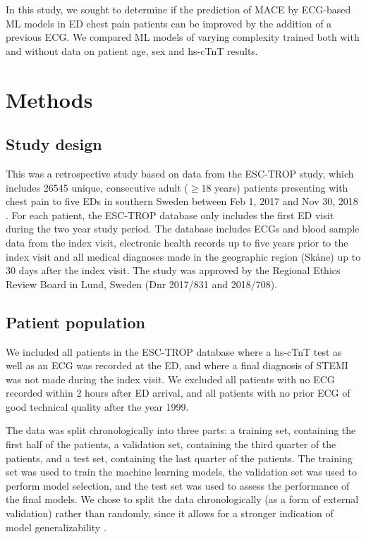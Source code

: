 \documentclass[preprint]{elsarticle}
\begin{document}
In this study, we sought to determine if the prediction of MACE by ECG-based ML models in ED chest pain patients can be improved by the addition of a previous ECG. We compared ML models of varying complexity trained both with and without data on patient age, sex and hs-cTnT results.

\section{Methods}
\subsection{Study design}
This was a retrospective study based on data from the ESC-TROP study, which includes 26545 unique, consecutive adult ($\geq 18$ years) patients presenting with chest pain to five EDs in southern Sweden between Feb 1, 2017 and Nov 30, 2018 \citep{mokhtari2020}. For each patient, the ESC-TROP database only includes the first ED visit during the two year study period. The database includes ECGs and blood sample data from the index visit, electronic health records up to five years prior to the index visit and all medical diagnoses made in the geographic region (Sk\aa{}ne) up to 30 days after the index visit. The study was approved by the Regional Ethics Review Board in Lund, Sweden (Dnr 2017/831 and 2018/708). 
\subsection{Patient population}
We included all patients in the ESC-TROP database where a hs-cTnT test as well as an ECG was recorded at the ED, and where a final diagnosis of STEMI was not made during the index visit. We excluded all patients with no ECG recorded within 2 hours after ED arrival, and all patients with no prior ECG of good technical quality after the year 1999.

The data was split chronologically into three parts: a training set, containing the first half of the patients, a validation set, containing the third quarter of the patients, and a test set, containing the last quarter of the patients. The training set was used to train the machine learning models, the validation set was used to perform model selection, and the test set was used to assess the performance of the final models. We chose to split the data chronologically (as a form of external validation) rather than randomly, since it allows for a stronger indication of model generalizability \citep{steyerberg2009}.
\end{document}
